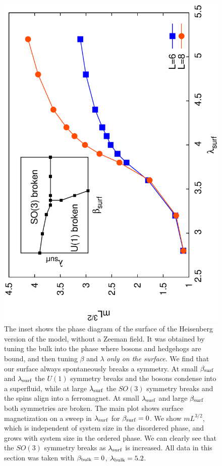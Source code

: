 \documentclass[prb,twocolumn]{revtex4-1}
\begin{document}
\begin{figure}
\includegraphics[angle=-90,width=0.9\linewidth]{figures/heissurf.eps}
\caption{The inset shows the phase diagram of the surface of the Heisenberg version of the model, without a Zeeman field. It was obtained by tuning the bulk into the phase where bosons and hedgehogs are bound, and then tuning $\beta$ and $\lambda$ {\em only on the surface}.  We find that our surface always spontaneously breaks  a symmetry. At small $\beta_{\rm surf}$ and $\lambda_{\rm surf}$ the $U(1)$ symmetry breaks and the bosons condense into a superfluid, while at large $\lambda_{\rm surf}$ the $SO(3)$ symmetry breaks and the spins align into a ferromagnet. At small $\lambda_{\rm surf}$ and large $\beta_{\rm surf}$ both symmetries are broken.  The main plot shows surface magnetization on a sweep in $\lambda_{\rm surf}$ for $\beta_{\rm surf}=0$. We show $mL^{3/2}$, which is independent of system size in the disordered phase, and grows with system size in the ordered phase. We can clearly see that the $SO(3)$ symmetry breaks as $\lambda_{\rm surf}$ is increased. All data in this section was taken with $\beta_{\rm bulk}=0$, $\lambda_{\rm bulk}=5.2$.}
\label{heissurf}
\end{figure}
\end{document}
